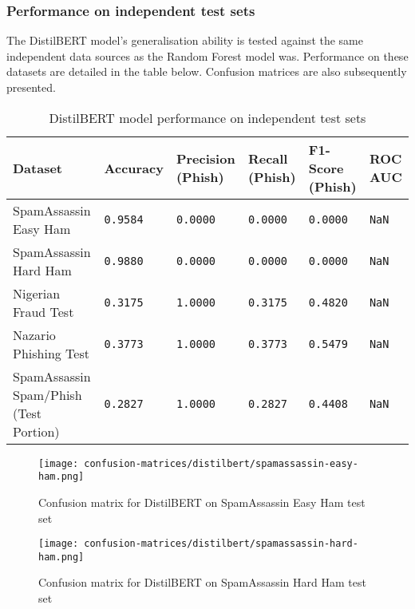 
\subsubsection*{Performance on independent test sets}
The DistilBERT model's generalisation ability is tested against the same independent data sources as the Random Forest model was. Performance on these datasets are detailed in the table below. Confusion matrices are also subsequently presented.

\begin{table}[h]
\centering
\begin{tabularx}{\textwidth}{|X|X|X|X|X|X|}
\hline
\textbf{Dataset} & \textbf{Accuracy} & \textbf{Precision (Phish)} & \textbf{Recall (Phish)} & \textbf{F1-Score (Phish)} & \textbf{ROC AUC} \\
\hline
SpamAssassin Easy Ham & \texttt{0.9584} & \texttt{0.0000} & \texttt{0.0000} & \texttt{0.0000} & \texttt{NaN} \\
\hline
SpamAssassin Hard Ham & \texttt{0.9880} & \texttt{0.0000} & \texttt{0.0000} & \texttt{0.0000} & \texttt{NaN} \\
\hline
Nigerian Fraud Test & \texttt{0.3175} & \texttt{1.0000} & \texttt{0.3175} & \texttt{0.4820} & \texttt{NaN} \\
\hline
Nazario Phishing Test & \texttt{0.3773} & \texttt{1.0000} & \texttt{0.3773} & \texttt{0.5479} & \texttt{NaN} \\
\hline
SpamAssassin Spam/Phish (Test Portion) & \texttt{0.2827} & \texttt{1.0000} & \texttt{0.2827} & \texttt{0.4408} & \texttt{NaN} \\
\hline
\end{tabularx}
\caption{DistilBERT model performance on independent test sets}
\end{table}

\begin{figure}[H]
  \begin{center}
    \texttt{[image: confusion-matrices/distilbert/spamassassin-easy-ham.png]}
    \caption{Confusion matrix for DistilBERT on SpamAssassin Easy Ham test set}
  \end{center}
\end{figure}

\begin{figure}[H]
  \begin{center}
    \texttt{[image: confusion-matrices/distilbert/spamassassin-hard-ham.png]}
    \caption{Confusion matrix for DistilBERT on SpamAssassin Hard Ham test set}
  \end{center}
\end{figure}

